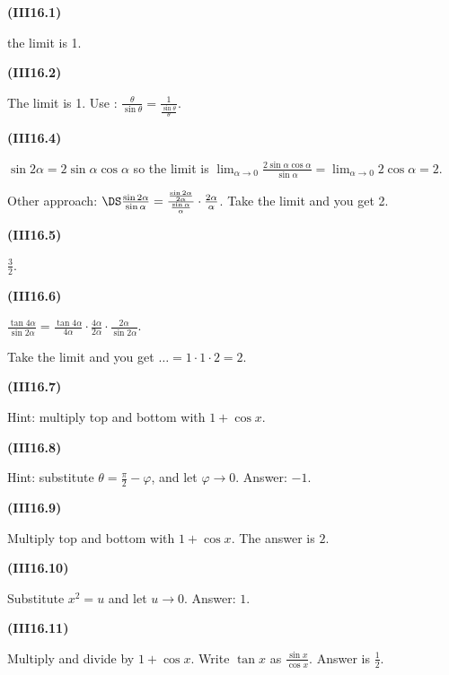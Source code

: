 \documentclass[openany,reqno]{amsbook}
\begin{document}
\begin{trivlist}
\item[{\bf(III16.1)}]

  the limit is 1.
  \bigskip

\item[{\bf(III16.2)}]

  The limit is 1.
  Use :
  $\frac{\theta}{\sin\theta} = \frac{1}{\frac{\sin\theta}{\theta}}$.
  \bigskip

\item[{\bf(III16.4)}]

  $\sin 2\alpha = 2\sin\alpha\cos\alpha$ so the limit is
  $\lim_{\alpha\to0} \frac{2\sin\alpha\cos\alpha}{\sin\alpha} =
  \lim_{\alpha\to0} 2\cos\alpha = 2$.

  Other approach: $\DS\frac{\sin2\alpha}{\sin\alpha} =
  \frac{\frac{\sin2\alpha}{2\alpha}}{\frac{\sin\alpha}{\alpha}}\cdot
  \frac{2\alpha}{\alpha}$. Take the limit and you get 2.
  \bigskip

\item[{\bf(III16.5)}]

  $\frac{3}{2}$.
  \bigskip

\item[{\bf(III16.6)}]

  $\frac{\tan 4\alpha}{\sin 2\alpha}
  = \frac{\tan 4\alpha}{4\alpha}\cdot
  \frac{4\alpha}{2\alpha}\cdot \frac{2\alpha}{\sin2\alpha}$.

  Take the limit and you get $\ldots = 1\cdot1\cdot2 = 2$.
  \bigskip

\item[{\bf(III16.7)}]

  Hint: multiply top and bottom with \(1+\cos x\).
  \bigskip

\item[{\bf(III16.8)}]

  Hint: substitute $\theta = \frac{\pi}{2} - \varphi$, and let
  $\varphi\to 0$.  Answer: $-1$.
  \bigskip

\item[{\bf(III16.9)}]

  Multiply top and bottom with $1+\cos x$.  The answer is $2$.
  \bigskip

\item[{\bf(III16.10)}]

  Substitute $x^2 = u$ and let $u\to 0$.  Answer: $1$.
  \bigskip

\item[{\bf(III16.11)}]

  Multiply and divide by $1+\cos x$.  Write $\tan x$ as $\frac{\sin x}{\cos x}$.
  Answer is $\frac12$.
  \bigskip


\end{trivlist}
\end{document}
